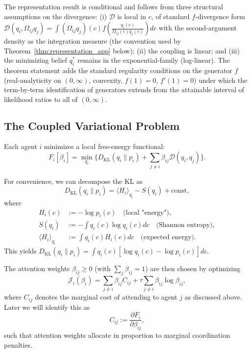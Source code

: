 \documentclass[11pt]{article}
\begin{document}
The representation result is conditional and follows from three structural assumptions on the divergence: (i) $\mathcal{D}$ is local in $c$, of standard $f$-divergence form $\displaystyle \mathcal{D}(q_i, \Omega_{ij}q_j) = \int (\Omega_{ij}q_j)(c) f\left(\frac{q_i(c)}{\Omega_{ij}(c) q_j(c)}\right) dc$ with the second-argument density as the integration measure (the convention used by Theorem~\ref{thm:representation_app} below); (ii) the coupling is linear; and (iii) the minimizing belief $q_i^*$ remains in the exponential-family (log-linear). The theorem statement adds the standard regularity conditions on the generator $f$ (real-analyticity on $(0,\infty)$, convexity, $f(1)=0$, $f'(1)=0$) under which the term-by-term identification of generators extends from the attainable interval of likelihood ratios to all of $(0,\infty)$.

\subsection*{The Coupled Variational Problem}

Each agent $i$ minimizes a local free-energy functional:
\begin{equation}
F_i[\beta_i]
=\min_{q_i}
\Big\{
D_{\mathrm{KL}}(q_i \| p_i)
+ \sum_{j\neq i} \beta_{ij}\mathcal{D}(q_i,q_j)
\Big\}.
\label{eq:F_i_app}
\end{equation}

For convenience, we can decompose the KL as
\begin{equation}
D_{\mathrm{KL}}(q_i \| p_i) = \langle H_i \rangle_{q_i} - S(q_i) + \text{const},
\end{equation}
where
\begin{align}
H_i(c) &:= -\log p_i(c) \quad \text{(local "energy")}, \\
S(q_i) &:= -\int q_i(c) \log q_i(c)dc \quad \text{(Shannon entropy)}, \\
\langle H_i \rangle_{q_i} &:= \int q_i(c) H_i(c)dc \quad \text{(expected energy)}.
\end{align}
This yields $D_{\mathrm{KL}}(q_i \| p_i) = \int q_i(c)[\log q_i(c) - \log p_i(c)]dc$.

The attention weights $\beta_{ij}\ge 0$ (with $\sum_j \beta_{ij}=1$) are then chosen by optimizing
\begin{equation}
\mathcal{J}_i(\beta_i)
=\sum_{j\neq i}\beta_{ij} C_{ij}
+ \tau \sum_{j\neq i}\beta_{ij}\log\beta_{ij},
\end{equation}
where $C_{ij}$ denotes the marginal cost of attending to agent $j$ as discussed above. Later we will identify this as
\begin{equation}
C_{ij} := \frac{\partial F_i}{\partial \beta_{ij}},
\end{equation}
such that attention weights allocate in proportion to marginal coordination penalties.
\end{document}
